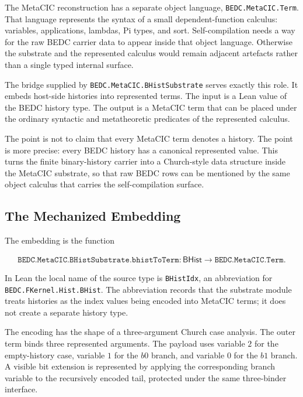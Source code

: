 The MetaCIC reconstruction has a separate object language,
\texttt{BEDC.MetaCIC.Term}. That language represents the syntax of a small
dependent-function calculus: variables, applications, lambdas, Pi types, and
sort. Self-compilation needs a way for the raw BEDC carrier data to appear
inside that object language. Otherwise the substrate and the represented
calculus would remain adjacent artefacts rather than a single typed internal
surface.

The bridge supplied by \texttt{BEDC.MetaCIC.BHistSubstrate} serves exactly
this role. It embeds host-side histories into represented terms. The input is
a Lean value of the BEDC history type. The output is a MetaCIC term that can
be placed under the ordinary syntactic and metatheoretic predicates of the
represented calculus.

The point is not to claim that every MetaCIC term denotes a history. The point
is more precise: every BEDC history has a canonical represented value. This
turns the finite binary-history carrier into a Church-style data structure
inside the MetaCIC substrate, so that raw BEDC rows can be mentioned by the
same object calculus that carries the self-compilation surface.

\subsection{The Mechanized Embedding}
\label{subsec:bhist-substrate-embedding}

The embedding is the function

$$
\begin{aligned}
\texttt{BEDC.MetaCIC.BHistSubstrate.bhistToTerm}
  : \mathsf{BHist} \to \texttt{BEDC.MetaCIC.Term}.
\end{aligned}
$$


In Lean the local name of the source type is
\texttt{BHistIdx}, an abbreviation for
\texttt{BEDC.FKernel.Hist.BHist}. The abbreviation records that the substrate
module treats histories as the index values being encoded into MetaCIC terms;
it does not create a separate history type.

The encoding has the shape of a three-argument Church case analysis. The
outer term binds three represented arguments. The payload uses variable $2$
for the empty-history case, variable $1$ for the $b0$ branch, and variable $0$
for the $b1$ branch. A visible bit extension is represented by applying the
corresponding branch variable to the recursively encoded tail, protected
under the same three-binder interface.

